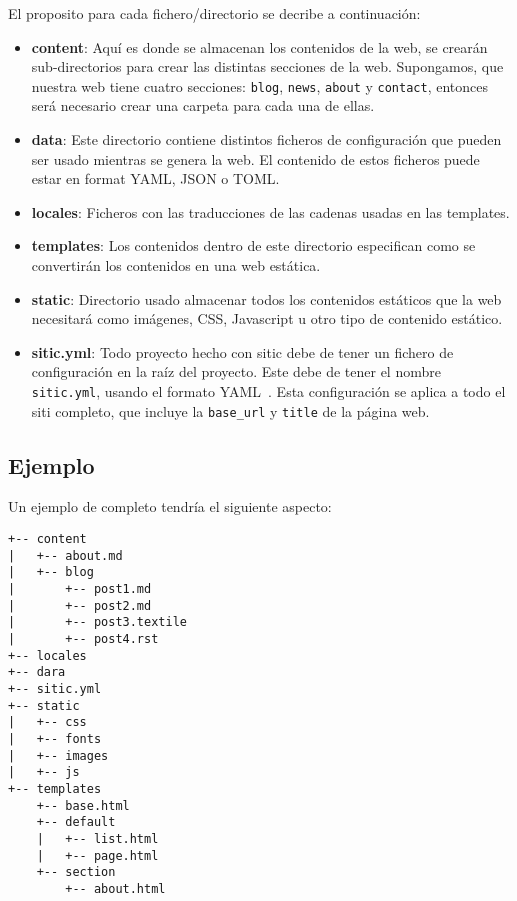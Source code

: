 El proposito para cada fichero/directorio se decribe a continuación:

\begin{itemize}
    \item \textbf{content}: Aquí es donde se almacenan los contenidos de la web, se crearán
        sub-directorios para crear las distintas secciones de la web. Supongamos, que nuestra web
        tiene cuatro secciones: \texttt{blog}, \texttt{news}, \texttt{about} y \texttt{contact},
        entonces será necesario crear una carpeta para cada una de ellas.
    \item \textbf{data}: Este directorio contiene distintos ficheros de configuración que pueden
        ser usado mientras se genera la web. El contenido de estos ficheros puede estar en format
        YAML, JSON o TOML.
    \item \textbf{locales}: Ficheros con las traducciones de las cadenas usadas en las templates.
    \item \textbf{templates}: Los contenidos dentro de este directorio especifican como se convertirán
        los contenidos en una web estática.
    \item \textbf{static}: Directorio usado almacenar todos los contenidos estáticos que la web
        necesitará como imágenes, CSS, Javascript u otro tipo de contenido estático.
    \item \textbf{sitic.yml}: Todo proyecto hecho con sitic debe de tener un fichero
        de configuración en la raíz del proyecto. Este debe de tener el nombre \texttt{sitic.yml},
        usando el formato YAML~\cite{yaml}. Esta configuración se aplica a todo el siti completo,
        que incluye la \texttt{base\_url} y \texttt{title} de la página web.
\end{itemize}

\subsection{Ejemplo}
Un ejemplo de completo tendría el siguiente aspecto:

\begin{verbatim}
+-- content
|   +-- about.md
|   +-- blog
|       +-- post1.md
|       +-- post2.md
|       +-- post3.textile
|       +-- post4.rst
+-- locales
+-- dara
+-- sitic.yml
+-- static
|   +-- css
|   +-- fonts
|   +-- images
|   +-- js
+-- templates
    +-- base.html
    +-- default
    |   +-- list.html
    |   +-- page.html
    +-- section
        +-- about.html
\end{verbatim}

